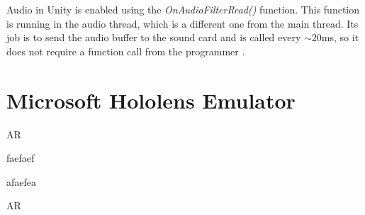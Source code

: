 Audio in Unity\textsuperscript{\textregistered} is enabled using the \textit{OnAudioFilterRead()} function. This function is running in the audio thread, which is a different one from the main thread. Its job is to send the audio buffer to the sound card and is called every $\sim 20$ms, so it does not require a function call from the programmer \cite{bib:unity_doc}.

\section{Microsoft Hololens Emulator}

\gls{AR} 

faefaef


afaefea

\gls{AR}

